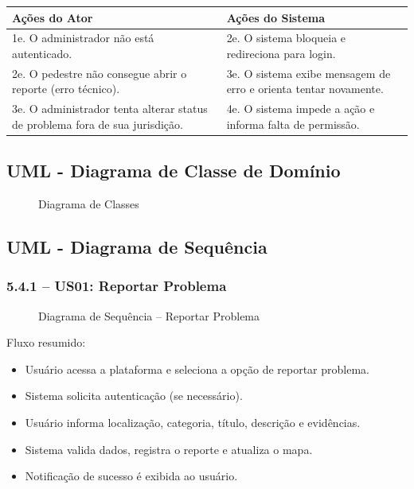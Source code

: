 \documentclass[12pt,a4paper]{article}
\begin{document}
\begin{longtable}{|>{\raggedright\arraybackslash}p{7cm}|>{\raggedright\arraybackslash}p{7cm}|}
\hline
\textbf{Ações do Ator} & \textbf{Ações do Sistema} \\
\hline
1e. O administrador não está autenticado. & 2e. O sistema bloqueia e redireciona para login. \\
\hline
2e. O pedestre não consegue abrir o reporte (erro técnico). & 3e. O sistema exibe mensagem de erro e orienta tentar novamente. \\
\hline
3e. O administrador tenta alterar status de problema fora de sua jurisdição. & 4e. O sistema impede a ação e informa falta de permissão. \\
\hline
\end{longtable}

\subsection{UML - Diagrama de Classe de Domínio}

\begin{figure}[H]
\centering

\caption{Diagrama de Classes}
\end{figure}

\subsection{UML - Diagrama de Sequência}

\subsubsection{5.4.1 – US01: Reportar Problema}

\begin{figure}[H]
    \centering
    
    \caption{Diagrama de Sequência – Reportar Problema}
\end{figure}

Fluxo resumido:
\begin{itemize}
    \item Usuário acessa a plataforma e seleciona a opção de reportar problema.
    \item Sistema solicita autenticação (se necessário).
    \item Usuário informa localização, categoria, título, descrição e evidências.
    \item Sistema valida dados, registra o reporte e atualiza o mapa.
    \item Notificação de sucesso é exibida ao usuário.
\end{itemize}
\end{document}
